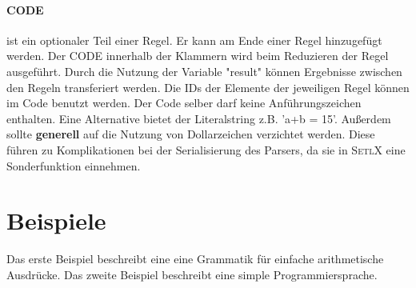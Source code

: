 \paragraph{CODE} ist ein optionaler Teil einer Regel. Er kann am Ende einer Regel hinzugefügt werden. Der CODE innerhalb der Klammern  wird beim Reduzieren der Regel ausgeführt. Durch die Nutzung der Variable "result" können Ergebnisse zwischen den Regeln transferiert werden. Die IDs der Elemente der jeweiligen Regel können im Code benutzt werden. Der Code selber darf keine Anführungszeichen enthalten. Eine Alternative bietet der Literalstring z.B. 'a+b = 15'. Außerdem sollte \textbf{generell} auf die Nutzung von Dollarzeichen verzichtet werden. Diese führen zu Komplikationen bei der Serialisierung des Parsers, da sie in \textsc{SetlX} eine Sonderfunktion einnehmen. 
\newpage
\section{Beispiele}
Das erste Beispiel beschreibt eine eine Grammatik für einfache arithmetische Ausdrücke.
Das zweite Beispiel beschreibt eine simple Programmiersprache.
